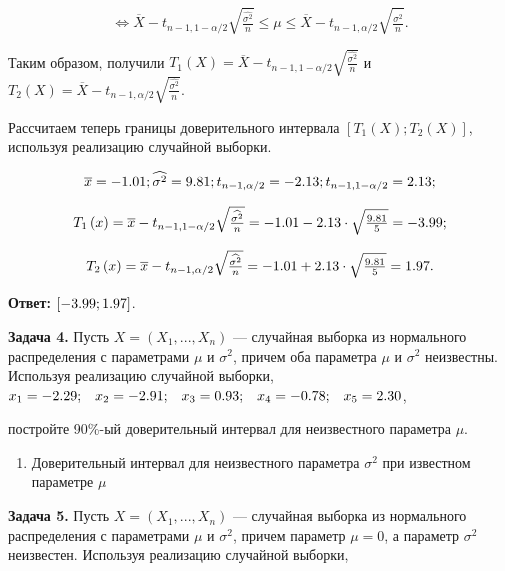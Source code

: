 \[\Leftrightarrow \overline{X}-t_{n-1,1-\alpha /2} \sqrt{{\tfrac{\widehat{\sigma ^{2} }}{n}} } \le \mu \le \overline{X}-t_{n-1,\alpha /2} \sqrt{{\tfrac{\widehat{\sigma ^{2} }}{n}} } .\] 

Таким образом, получили $T_{1} \left(X\right)=\overline{X}-t_{n-1,1-\alpha /2} \sqrt{{\tfrac{\widehat{\sigma ^{2} }}{n}} } $ и $T_{2} \left(X\right)=\overline{X}-t_{n-1,\alpha /2} \sqrt{{\tfrac{\widehat{\sigma ^{2} }}{n}} } $.

Рассчитаем теперь границы доверительного интервала $\left[T_{1} \left(X\right);T_{2} \left(X\right)\right]$, используя реализацию случайной выборки.

\[\overline{x}=-{\rm 1.01}; \widehat{\sigma ^{2} }={\rm 9.81}; t_{n-1,\alpha /2} =-{\rm 2.13}; t_{n-1,1-\alpha /2} ={\rm 2.13};\] 

\[T_{1} \left(x\right)=\overline{x}-t_{n-1,1-\alpha /2} \sqrt{{\tfrac{\widehat{\sigma ^{2} }}{n}} } =-{\rm 1.01}-{\rm 2.}13\cdot \sqrt{{\tfrac{{\rm 9.81}}{5}} } =-{\rm 3.99};\] 

\[T_{2} \left(x\right)=\overline{x}-t_{n-1,\alpha /2} \sqrt{{\tfrac{\widehat{\sigma ^{2} }}{n}} } =-{\rm 1.01+2.13}\cdot \sqrt{{\tfrac{{\rm 9.81}}{5}} } =1.97.\] 

\textbf{Ответ:} $\left[-{\rm 3.99};{\rm 1.97}\right]$.



\textbf{Задача 4.}  Пусть $X=\left(X_{1} ,...,X_{n} \right)$ --- случайная выборка из нормального распределения с параметрами $\mu $ и $\sigma ^{2} $, причем оба параметра $\mu $ и $\sigma ^{2} $ неизвестны. Используя реализацию случайной выборки, $x_{1} =-{\rm 2.29;}\quad x_{2} =-{\rm 2.91;}\quad x_{3} =0.{\rm 93;}\quad x_{4} =-0.{\rm 78;}\quad x_{5} ={\rm 2.3}0$, 

постройте 90\%-ый доверительный интервал для неизвестного параметра $\mu $.



\begin{enumerate}
\item  Доверительный интервал для неизвестного параметра $\sigma ^{2} $ при известном параметре $\mu $ 
\end{enumerate}



\textbf{Задача 5.}  Пусть $X=\left(X_{1} ,...,X_{n} \right)$ --- случайная выборка из нормального распределения с параметрами $\mu $ и $\sigma ^{2} $, причем параметр $\mu =0$, а параметр $\sigma ^{2} $ неизвестен. Используя реализацию случайной выборки, 

